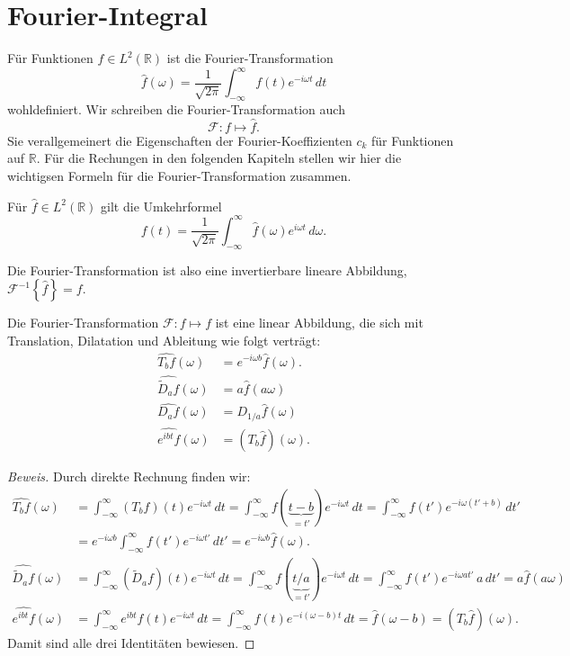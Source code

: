%
%
%
\section{Fourier-Integral
\label{section:fourier-integral}}
Für Funktionen $f\in L^2(\mathbb R)$ ist die Fourier-Transformation
\[
\hat{f}(\omega)
=
\frac{1}{\sqrt{2\pi}}
\int_{-\infty}^\infty f(t) e^{-i\omega t}\,dt
\]
wohldefiniert.
Wir schreiben die Fourier-Transformation auch
\[
\mathcal{F}\colon f\mapsto \hat{f}.
\]
Sie verallgemeinert die Eigenschaften der Fourier-Koeffizienten $c_k$
für Funktionen auf $\mathbb R$.
Für die Rechungen in den folgenden Kapiteln stellen wir hier die
wichtigsen Formeln für die Fourier-Transformation zusammen.

\begin{satz}
Für $\hat{f}\in L^2(\mathbb R)$ gilt die Umkehrformel
\[
f(t)
=
\frac{1}{\sqrt{2\pi}}
\int_{-\infty}^{\infty} \hat{f}(\omega)e^{i\omega t}\,d\omega.
\]
\end{satz}

Die Fourier-Transformation ist also eine invertierbare lineare Abbildung,
$\mathcal{F}^{-1}\!\left\lbrace\hat{f}\right\rbrace = f$.

\begin{satz}
\label{four-int:trans-dial}
Die Fourier-Transformation $\mathcal F\colon f\mapsto f$ ist eine linear
Abbildung, die sich mit Translation, Dilatation und Ableitung wie folgt
verträgt:
\begin{align*}
\widehat{T_bf}(\omega)
&=
e^{-i\omega b}\hat{f}(\omega).
\\
\widehat{\tilde{D}_af}(\omega)
&=
a \hat{f}(a\omega)
\\
\widehat{D_af}(\omega)
&=
D_{1/a}\hat{f}(\omega)
\\
\widehat{e^{ibt}f}(\omega)
&=
(T_b\hat{f})(\omega).
\end{align*}
\end{satz}

\begin{proof}[Beweis]
Durch direkte Rechnung finden wir:
\begin{align*}
\widehat{T_bf}(\omega)
&=
\int_{-\infty}^{\infty} (T_bf)(t)e^{-i\omega t}\,dt
=
\int_{-\infty}^{\infty} f(\underbrace{t-b}_{\displaystyle=t'})e^{-i\omega t}\,dt
=
\int_{-\infty}^{\infty} f(t')e^{-i\omega(t'+b)}\,dt'
\\
&=
e^{-i\omega b}
\int_{-\infty}^{\infty} f(t')e^{-i\omega t'}\,dt'
=
e^{-i\omega b}\hat{f}(\omega).
\\
\widehat{\tilde{D}_af}(\omega)
&=
\int_{-\infty}^\infty (\tilde{D}_af)(t)e^{-i\omega t}\,dt
=
\int_{-\infty}^\infty f(\underbrace{t/a}_{\displaystyle=t'})e^{-i\omega t}\,dt
=
\int_{-\infty}^\infty f(t')e^{-i\omega at'}\,a\,dt'
=
a \hat{f}(a\omega)
\\
\widehat{e^{ibt}f}(\omega)
&=
\int_{-\infty}^\infty e^{ibt}f(t)e^{-i\omega t}\,dt
=
\int_{-\infty}^\infty f(t)e^{-i(\omega -b)t}\,dt
=
\hat{f}(\omega-b)
=
(T_b\hat{f})(\omega).
\end{align*}
Damit sind alle drei Identitäten bewiesen.
\end{proof}

